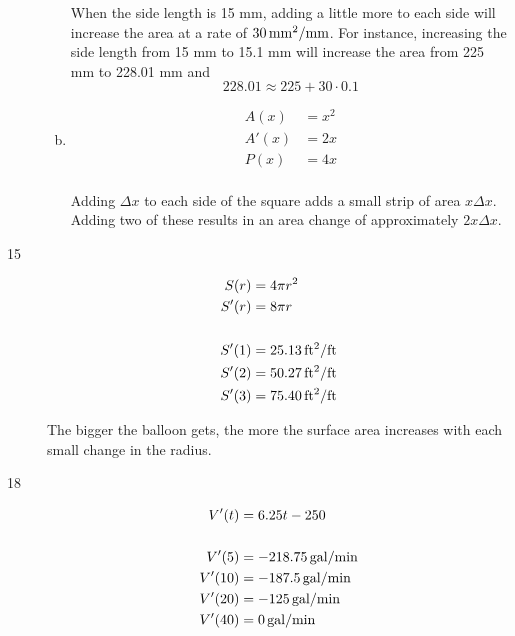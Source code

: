 \documentclass[letterpaper, landscape]{exam}
\begin{document}
\begin{description}
\begin{enumerate}[(a)]
          When the side length is 15 mm, adding a little more to each side will increase the area at
          a rate of $\unit[30]{mm^2/mm}$. For instance, increasing the side length from 15 mm to
          15.1 mm will increase the area from 225 mm to 228.01 mm and 
          \[
            228.01 \approx 225 + 30 \cdot 0.1 
          \]
          
        \item
          \begin{align*}
            A(x)  & = x^2 \\
            A'(x) & = 2x \\
            P(x)  & = 4x \\
          \end{align*}

          Adding $\Delta x$ to each side of the square adds a small strip of area $x \Delta x$.
          Adding two of these results in an area change of approximately $2 x \Delta x$. 

      \end{enumerate}

    \item[15]
      \begin{align*}
        S(r) &= 4 \pi r^2 \\
        S'(r) &= 8 \pi r \\
        \\
        S'(1) &= \unit[25.13]{ft^2/ft} \\
        S'(2) &= \unit[50.27]{ft^2/ft} \\
        S'(3) &= \unit[75.40]{ft^2/ft} \\
      \end{align*}

      The bigger the balloon gets, the more the surface area increases with each
      small change in the radius.

    \item[18]
      \begin{align*}
        V'(t)  & = 6.25t - 250 \\
        \\
        V'(5)  & = \unit[-218.75]{gal/min} \\
        V'(10) & = \unit[-187.5]{gal/min} \\
        V'(20) & = \unit[-125]{gal/min} \\
        V'(40) & = \unit[0]{gal/min} \\
      \end{align*}


\end{description}
\end{document}
